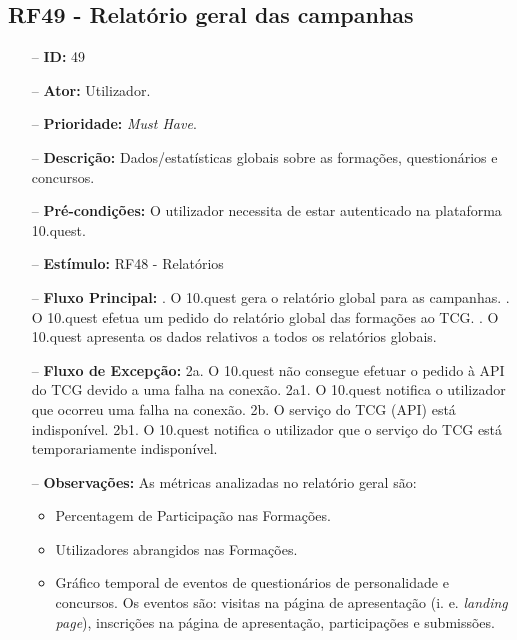 \subsection{RF49 - Relatório geral das campanhas}
\begin{itemize}
	\item[--] \textbf{ID:} 49
	\item[--]  \textbf{Ator:} Utilizador.
	\item[--]  \textbf{Prioridade:} \textit{Must Have}.
	\item[--]  \textbf{Descrição:} Dados/estatísticas globais sobre as formações, questionários e concursos.
	\item[--]  \textbf{Pré-condições:} O utilizador necessita de estar autenticado na plataforma 10.quest.
	\item[--]  \textbf{Estímulo:} RF48 - Relatórios
	\item[--]  \textbf{Fluxo Principal:} 
	. O 10.quest gera o relatório global para as campanhas.
	. O 10.quest efetua um pedido do relatório global das formações ao TCG.
	. O 10.quest apresenta os dados relativos a todos os relatórios globais.
	\item[--]  \textbf{Fluxo de Excepção:} 
	\subitem 2a. O 10.quest não consegue efetuar o pedido à API do TCG devido a uma falha na conexão.
	\subitem 2a1. O 10.quest notifica o utilizador que ocorreu uma falha na conexão.
	\subitem 2b. O serviço do TCG (API) está indisponível.
	\subitem 2b1. O 10.quest notifica o utilizador que o serviço do TCG está temporariamente indisponível. 
	\item[--]  \textbf{Observações:} As métricas analizadas no relatório geral são:
	\begin{itemize}
		\item Percentagem de Participação nas Formações.
		\item Utilizadores abrangidos nas Formações.
		\item Gráfico temporal de eventos de questionários de personalidade e concursos. Os eventos são: visitas na página de apresentação (i. e. \textit{landing page}), inscrições na página de apresentação, participações e submissões. 
	\end{itemize}
\end{itemize}
\newpage

